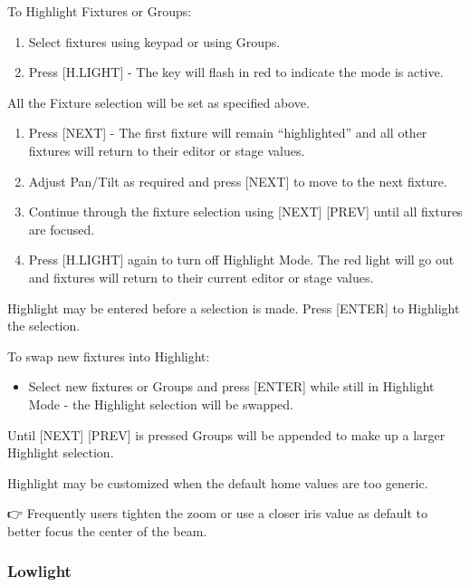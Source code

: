 \documentclass[
]{article}
\providecommand{\tightlist}{%
  \setlength{\itemsep}{0pt}\setlength{\parskip}{0pt}}
\begin{document}
To Highlight Fixtures or Groups:

\begin{enumerate}
\def\labelenumi{\arabic{enumi}.}
\item
  Select fixtures using keypad or using Groups.
\item
  Press {[}H.LIGHT{]} - The key will flash in {red} to indicate the mode is active.
\end{enumerate}

All the Fixture selection will be set as specified above.

\begin{enumerate}
\def\labelenumi{\arabic{enumi}.}
\setcounter{enumi}{2}
\item
  Press {[}NEXT{]} - The first fixture will remain ``highlighted'' and all other fixtures will return to their editor or stage values.
\item
  Adjust Pan/Tilt as required and press {[}NEXT{]} to move to the next fixture.
\item
  Continue through the fixture selection using {[}NEXT{]} {[}PREV{]} until all fixtures are focused.
\item
  Press {[}H.LIGHT{]} again to turn off Highlight Mode. The red light will go out and fixtures will return to their current editor or stage values.
\end{enumerate}

Highlight may be entered before a selection is made.
Press {[}ENTER{]} to Highlight the selection.

To swap new fixtures into Highlight:

\begin{itemize}
\tightlist
\item
  Select new fixtures or Groups and press {[}ENTER{]} while still in Highlight Mode - the Highlight selection will be swapped.
\end{itemize}

Until {[}NEXT{]} {[}PREV{]} is pressed Groups will be appended to make up a larger Highlight selection.

Highlight may be customized when the default home values are too generic.

👉 Frequently users tighten the zoom or use a closer iris value as default to better focus the center of the beam.

\hypertarget{lowlight}{%
\subsubsection{Lowlight}\label{lowlight}}
\end{document}
